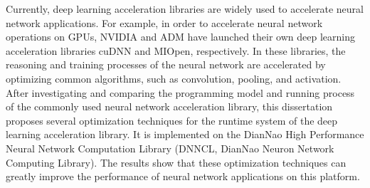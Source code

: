 \begin{enabstract}
  Currently, deep learning acceleration libraries are widely used to accelerate neural network applications. For example, in order to accelerate neural network operations on GPUs, NVIDIA and ADM have launched their own deep learning acceleration libraries cuDNN and MIOpen, respectively. In these libraries, the reasoning and training processes of the neural network are accelerated by optimizing common algorithms, such as convolution, pooling, and activation. After investigating and comparing the programming model and running process of the commonly used neural network acceleration library, this dissertation proposes several optimization techniques for the runtime system of the deep learning acceleration library. It is implemented on the DianNao High Performance Neural Network Computation Library (DNNCL, DianNao Neuron Network Computing Library). The results show that these optimization techniques can greatly improve the performance of neural network applications on this platform.


\end{enabstract}
